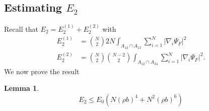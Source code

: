 \documentclass[a4paper,11pt]{article}
\newcommand{\abs}[1]{\left\lvert #1 \right\rvert}
\newtheorem{lemma}{Lemma}
\numberwithin{equation}{section}
\begin{document}
		\subsection{Estimating $ E_2 $}
		Recall that $ E_2=E_2^{(1)}+E_2^{(2)} $ with \begin{equation}
		\begin{aligned}
		E_2^{(1)}&=\binom{N}{2}2N\int_{A_{12}\cap A_{13}}\sum_{i=1}^{N}\abs{\nabla_i\Psi_F}^2\\ E_2^{(2)}&=\binom{N}{2}\binom{N-2}{2}\int_{A_{12}\cap A_{34}}\sum_{i=1}^{N}\abs{\nabla_i\Psi_F}^2.
		\end{aligned}
		\end{equation}
		We now prove the result
		\begin{lemma}\label{LemmaE2Bound}
			\begin{equation}
			E_2\leq E_0(N(\rho b)^4+N^2(\rho b)^6)
			\end{equation}
		\end{lemma}
\end{document}
